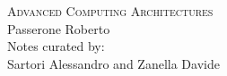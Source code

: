\documentclass[a4paper]{report}
\begin{document}
\begin{center}
    \begin{figure}[h!]
        \centerline{}
    \end{figure}
    \vspace{2 cm}
    \Huge\textsc{Advanced Computing Architectures\\}
    \vspace{1 cm}
    \large{Passerone Roberto\\}
    \vspace{6 cm}
    \large{Notes curated by:\\Sartori Alessandro and Zanella Davide}
\end{center}

\clearpage

\tableofcontents










\end{document}
